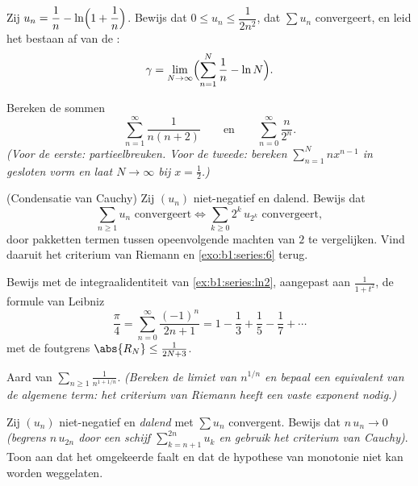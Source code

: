 \begin{exercise}[$\star\star$]\label{exo:b1:series:7}
Zij $u_n = \dfrac{1}{n} - \ln\Bigl(1 + \dfrac1n\Bigr)$. Bewijs dat
$0 \leq u_n \leq \dfrac{1}{2n^2}$, dat $\sum u_n$ convergeert, en
leid het bestaan af van de :
\[
\gamma = \lim_{N \to \infty} \Bigl( \sum_{n=1}^{N} \frac 1n - \ln N
\Bigr) .
\]
\end{exercise}

\begin{exercise}[$\star\star$]\label{exo:b1:series:8}
Bereken de sommen
\[
\sum_{n=1}^{\infty} \frac{1}{n(n+2)}
\qquad\text{en}\qquad
\sum_{n=0}^{\infty} \frac{n}{2^n} .
\]
\emph{(Voor de eerste: partieelbreuken. Voor de tweede: bereken
$\sum_{n=1}^{N} n x^{n-1}$ in gesloten vorm en laat $N \to \infty$
bij $x = \frac12$.)}
\end{exercise}

\begin{exercise}[$\star\star\star$]\label{exo:b1:series:9}
(Condensatie van Cauchy) Zij $(u_n)$ niet-negatief en dalend.
Bewijs dat
\[
\sum_{n \geq 1} u_n \text{ convergeert}
\iff
\sum_{k \geq 0} 2^k\, u_{2^k} \text{ convergeert},
\]
door pakketten termen tussen opeenvolgende machten van $2$ te
vergelijken. Vind daaruit het criterium van Riemann en
\cref{exo:b1:series:6} terug.
\end{exercise}

\begin{exercise}[$\star\star\star$]\label{exo:b1:series:10}
Bewijs met de integraalidentiteit van \cref{ex:b1:series:ln2},
aangepast aan $\frac{1}{1+t^2}$, de formule van Leibniz
\[
\frac{\pi}{4} = \sum_{n=0}^{\infty} \frac{(-1)^n}{2n+1}
= 1 - \frac13 + \frac15 - \frac17 + \cdots
\]
met de foutgrens $\abs{R_N} \leq \frac{1}{2N+3}$.
\end{exercise}

\begin{exercise}[$\star\star$]\label{exo:b1:series:11}
Aard van $\displaystyle\sum_{n \geq 1} \frac{1}{n^{1 + 1/n}}$.
\emph{(Bereken de limiet van $n^{1/n}$ en bepaal een equivalent van
de algemene term: het criterium van Riemann heeft een
\emph{vaste} exponent nodig.)}
\end{exercise}

\begin{exercise}[$\star\star\star$]\label{exo:b1:series:12}
Zij $(u_n)$ niet-negatief en \emph{dalend} met $\sum u_n$
convergent. Bewijs dat $n\,u_n \to 0$ \emph{(begrens $n\,u_{2n}$
door een schijf $\sum_{k=n+1}^{2n} u_k$ en gebruik het criterium
van Cauchy)}. Toon aan dat het omgekeerde faalt en dat de
hypothese van monotonie niet kan worden weggelaten.
\end{exercise}

